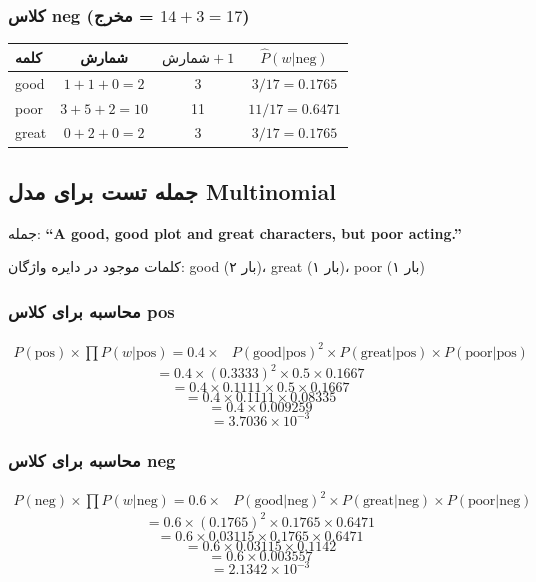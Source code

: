 \documentclass[11pt,a4paper]{article}
\newcommand{\en}[1]{\textenglish{#1}}
\begin{document}
\subsubsection*{کلاس \en{neg} (مخرج = $14 + 3 = 17$)}
\begin{center}
\begin{tabular}{|l|c|c|c|}
\hline
\textbf{کلمه} & \textbf{شمارش} & $\text{شمارش} + 1$ & $\hat{P}(w|\text{neg})$ \\
\hline
\en{good} & $1 + 1 + 0 = 2$ & 3 & $3/17 = 0.1765$ \\
\hline
\en{poor} & $3 + 5 + 2 = 10$ & 11 & $11/17 = 0.6471$ \\
\hline
\en{great} & $0 + 2 + 0 = 2$ & 3 & $3/17 = 0.1765$ \\
\hline
\end{tabular}
\end{center}

\subsection*{جمله تست برای مدل \en{Multinomial}}
جمله: \textbf{\en{``A good, good plot and great characters, but poor acting.''}}

کلمات موجود در دایره واژگان: \en{good} (۲ بار)، \en{great} (۱ بار)، \en{poor} (۱ بار)

\subsubsection*{محاسبه برای کلاس \en{pos}}
\[
\begin{aligned}
P(\text{pos}) \times \prod P(w|\text{pos}) = 0.4 \times & P(\text{good}|\text{pos})^2 \times P(\text{great}|\text{pos}) \times P(\text{poor}|\text{pos})
\end{aligned}
\]
\[
= 0.4 \times (0.3333)^2 \times 0.5 \times 0.1667
\]
\[
= 0.4 \times 0.1111 \times 0.5 \times 0.1667
\]
\[
= 0.4 \times 0.1111 \times 0.08335
\]
\[
= 0.4 \times 0.009259
\]
\[
= 3.7036 \times 10^{-3}
\]

\subsubsection*{محاسبه برای کلاس \en{neg}}
\[
\begin{aligned}
P(\text{neg}) \times \prod P(w|\text{neg}) = 0.6 \times & P(\text{good}|\text{neg})^2 \times P(\text{great}|\text{neg}) \times P(\text{poor}|\text{neg})
\end{aligned}
\]
\[
= 0.6 \times (0.1765)^2 \times 0.1765 \times 0.6471
\]
\[
= 0.6 \times 0.03115 \times 0.1765 \times 0.6471
\]
\[
= 0.6 \times 0.03115 \times 0.1142
\]
\[
= 0.6 \times 0.003557
\]
\[
= 2.1342 \times 10^{-3}
\]
\end{document}
